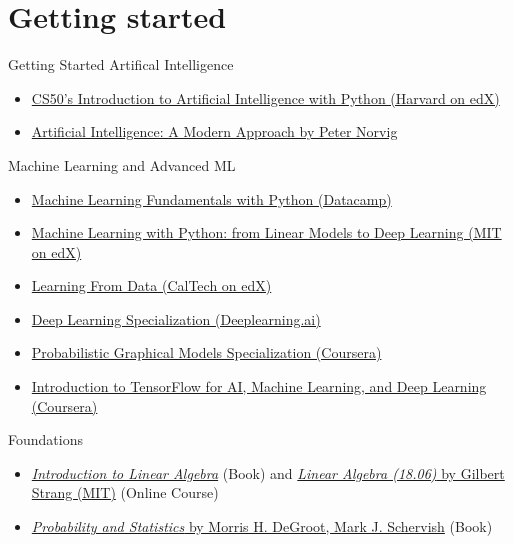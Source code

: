 \documentclass{beamer}
\begin{document}
\section{Getting started}
\label{sec:GettingStartedInML}
\begin{frame}[allowframebreaks]{Getting Started}
Artifical Intelligence
\begin{itemize}
\item \href{https://www.edx.org/course/cs50s-introduction-to-artificial-intelligence-with-python}{CS50's Introduction to Artificial Intelligence with Python (Harvard on edX)}
\item \href{http://aima.cs.berkeley.edu/}{Artificial Intelligence: A Modern Approach by Peter Norvig}
\end{itemize}
Machine Learning and Advanced ML
\begin{itemize}
\item \href{https://www.datacamp.com/tracks/machine-learning-fundamentals-with-python}{Machine Learning Fundamentals with Python (Datacamp)}
\item \href{https://www.edx.org/course/machine-learning-with-python-from-linear-models-to?index=product&queryID=3236d952a8cb57394e4415a111bcecb8&position=17}{Machine Learning with Python: from Linear Models to Deep Learning (MIT on edX)}
\item \href{https://www.edx.org/course/learning-from-data-introductory-machine-learning?index=product&queryID=19fa68b3b5207bdf2fb026fc68b342f9&position=1}{Learning From Data (CalTech on edX)}
\item \href{https://www.coursera.org/specializations/deep-learning}{Deep Learning Specialization (Deeplearning.ai)}
\item \href{https://www.coursera.org/specializations/probabilistic-graphical-models?}{Probabilistic Graphical Models Specialization (Coursera)}
\item \href{https://www.coursera.org/learn/introduction-tensorflow/}{Introduction to TensorFlow for AI, Machine Learning, and Deep Learning (Coursera)}
\end{itemize}
\framebreak
Foundations
\begin{itemize}
\item \href{https://math.mit.edu/~gs/linearalgebra/}{\textit{Introduction to Linear Algebra}} (Book) and \href{https://ocw.mit.edu/courses/mathematics/18-06sc-linear-algebra-fall-2011/}{\textit{Linear Algebra (18.06)} by Gilbert Strang (MIT)} (Online Course)
\item \href{https://www.pearson.com/us/higher-education/program/De-Groot-Probability-and-Statistics-4th-Edition/PGM146802.html}{\textit{Probability and Statistics} by Morris H. DeGroot, Mark J. Schervish} (Book)

\end{itemize}
\end{frame}
\end{document}
